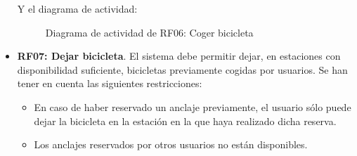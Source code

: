\begin{itemize}
	\FloatBarrier
	Y el diagrama de actividad:
	\begin{figure}[!htb]
		\centering
		\caption{Diagrama de actividad de RF06: Coger bicicleta}
		\label{fig:diagramaActividad_RF06}
	\end{figure}
	
	\FloatBarrier
	\item \textbf{RF07: Dejar bicicleta}. El sistema debe permitir dejar, en estaciones con disponibilidad suficiente, bicicletas previamente cogidas por usuarios. Se han tener en cuenta las siguientes restricciones:
	\begin{itemize}
		\item En caso de haber reservado un anclaje previamente, el usuario sólo puede dejar la bicicleta en la estación en la que haya realizado dicha reserva.
		\item Los anclajes reservados por otros usuarios no están disponibles.
	\end{itemize}
	

\end{itemize}
